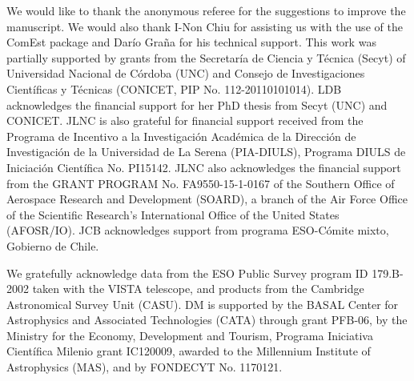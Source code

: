 \documentclass[preprint2]{aastex}
\begin{document}
We would like to thank the anonymous referee for the suggestions to improve
the manuscript. We would also thank I-Non Chiu for assisting us with the
use of the
ComEst package and Dar\'io Gra\~na for his technical support. 
This work was partially supported by grants from the Secretar\'ia
de Ciencia y T\'ecnica (Secyt) of Universidad Nacional de C\'ordoba (UNC)
 and Consejo de Investigaciones Cient\'ificas y 
T\'ecnicas (CONICET, PIP No. 112-20110101014).  LDB acknowledges the financial 
support for her PhD thesis 
from Secyt (UNC) and CONICET.  JLNC is also grateful for financial support
received from the 
Programa de Incentivo a la 
Investigaci\'on Acad\'emica de la Direcci\'on de Investigaci\'on de la 
Universidad de La Serena (PIA-DIULS), Programa DIULS de Iniciaci\'on 
Cient\'ifica No. PI15142. JLNC also acknowledges the 
financial support from the 
GRANT PROGRAM No. FA9550-15-1-0167 of the Southern Office of Aerospace 
Research and Development (SOARD), a branch of the Air Force Office of the
Scientific Research's International Office of the United States (AFOSR/IO).
JCB acknowledges support from programa ESO-C\'omite mixto, Gobierno de Chile.

We gratefully acknowledge data from the ESO Public Survey program ID 179.B-2002 taken with the VISTA telescope, and products from the
Cambridge Astronomical Survey Unit (CASU). 
DM is supported by the BASAL Center for Astrophysics and Associated Technologies (CATA) through grant PFB-06, by the Ministry for the
Economy, Development and Tourism, Programa Iniciativa Cient\'ifica Milenio grant IC120009, awarded to the Millennium Institute of
Astrophysics (MAS), and by FONDECYT No. 1170121.

\clearpage



\end{document}
